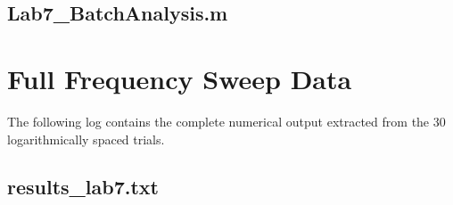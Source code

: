 \documentclass[11pt]{article}
\begin{document}
\subsection{Lab7\_BatchAnalysis.m}


\newpage
\section{Full Frequency Sweep Data}
The following log contains the complete numerical output extracted from the 30 logarithmically spaced trials.

\subsection{results\_lab7.txt}

\end{document}
